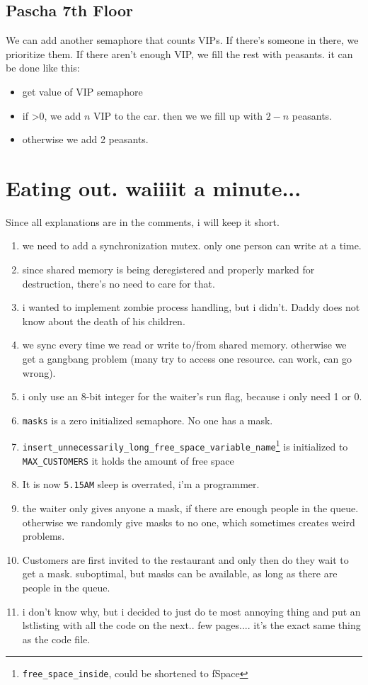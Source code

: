 \documentclass[a4paper, 11pt]{article}
\begin{document}
    \subsection{Pascha 7th Floor}
    We can add another semaphore that counts VIPs. If there's someone in there, we prioritize them.
    If there aren't enough VIP, we fill the rest with peasants.
    it can be done like this:
    \begin{itemize}
          \item get value of VIP semaphore
          \item if >0, we add $n$ VIP to the car. then we we fill up with $2-n$ peasants.
          \item otherwise we add 2 peasants.
    \end{itemize}
    \section{Eating out. waiiiit a minute...}
    Since all explanations are in the comments, i will keep it short.
    \begin{enumerate}
          \item we need to add a synchronization mutex. only one person can write at a time.
          \item since shared memory is being deregistered and properly marked for destruction, there's no need to care for that.
          \item i wanted to implement zombie process handling, but i didn't. Daddy does not know about the death of his children.
          \item we sync every time we read or write to/from shared memory. otherwise we get a gangbang problem (many try to access one resource. can work, can go wrong).
          \item i only use an 8-bit integer for the waiter's run flag, because i only need 1 or 0.
          \item \texttt{masks} is a zero initialized semaphore. No one has a mask.
          \item \texttt{insert\_unnecessarily\_long\_free\_space\_variable\_name}\footnote{\texttt{free\_space\_inside}, could be shortened to fSpace} is initialized to \texttt{MAX\_CUSTOMERS} it holds the amount of free space
          \item It is now \texttt{5.15AM} sleep is overrated, i'm a programmer.
          \item the waiter only gives anyone a mask, if there are enough people in the queue. otherwise we randomly give masks to no one, which sometimes creates weird problems.
          \item Customers are first invited to the restaurant and only then do they wait to get a mask. suboptimal, but masks can be available, as long as there are people in the queue.
          \item i don't know why, but i decided to just do te most annoying thing and put an lstlisting with all the code on the next.. few pages.... it's the exact same thing as the code file.
    \end{enumerate}
    \newpage
    
    
\end{document}
